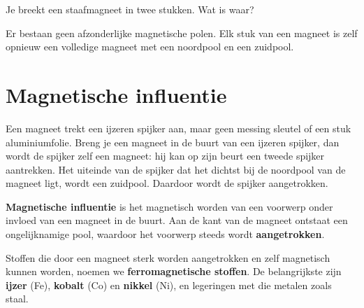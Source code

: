 \documentclass{ximera}
\begin{document}
\begin{question}
    Je breekt een staafmagneet in twee stukken. Wat is waar?

    \begin{multipleChoice}
    \end{multipleChoice}

    \begin{solution}\nl
        Er bestaan geen afzonderlijke magnetische polen. Elk stuk van een magneet is zelf opnieuw een volledige magneet met een noordpool en een zuidpool.
    \end{solution}
\end{question}

\section{Magnetische influentie}\label{sec:influentie}
Een magneet trekt een ijzeren spijker aan, maar geen messing sleutel of een stuk aluminiumfolie. Breng je een magneet in de buurt van een ijzeren spijker, dan wordt de spijker zelf een magneet: hij kan op zijn beurt een tweede spijker aantrekken. Het uiteinde van de spijker dat het dichtst bij de noordpool van de magneet ligt, wordt een zuidpool. Daardoor wordt de spijker aangetrokken.

\begin{definition}[foldable=true,title={Magnetische influentie}]\nl
    \textbf{Magnetische influentie} is het magnetisch worden van een voorwerp onder invloed van een magneet in de buurt. Aan de kant van de magneet ontstaat een ongelijknamige pool, waardoor het voorwerp steeds wordt \textbf{aangetrokken}.
\end{definition}

\begin{definition}[foldable=true,title={Ferromagnetische stoffen}]\nl
    Stoffen die door een magneet sterk worden aangetrokken en zelf magnetisch kunnen worden, noemen we \textbf{ferromagnetische stoffen}. De belangrijkste zijn \textbf{ijzer} (Fe), \textbf{kobalt} (Co) en \textbf{nikkel} (Ni), en legeringen met die metalen zoals staal.
\end{definition}
\end{document}

